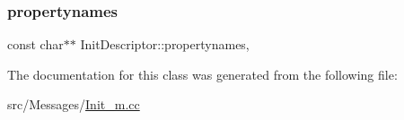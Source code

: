 \subsubsection{\texorpdfstring{propertynames}{propertynames}}
{\footnotesize\ttfamily const char$\ast$$\ast$ Init\+Descriptor\+::propertynames\hspace{0.3cm}{\ttfamily [mutable]}, {\ttfamily [private]}}



The documentation for this class was generated from the following file\+:\begin{DoxyCompactItemize}
\item 
src/\+Messages/\hyperlink{Init__m_8cc}{Init\+\_\+m.\+cc}\end{DoxyCompactItemize}
